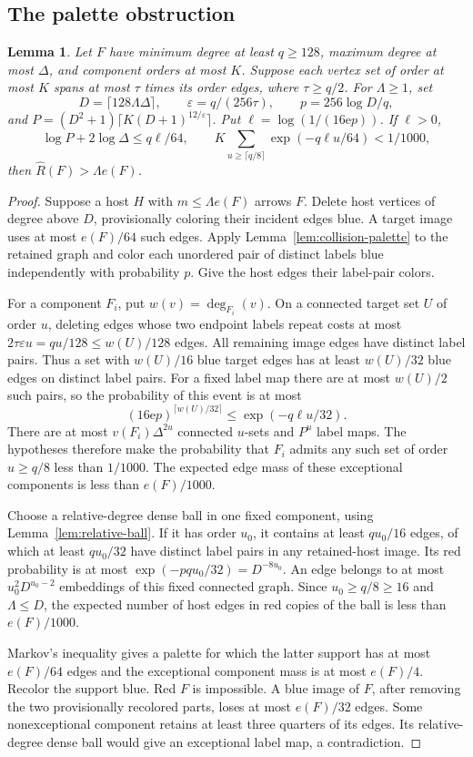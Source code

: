 \documentclass[11pt]{amsart}
\newtheorem{lemma}[theorem]{Lemma}
\theoremstyle{definition}
\theoremstyle{remark}
\numberwithin{equation}{section}
\newcommand{\e}{\mathrm e}
\begin{document}
\subsection{The palette obstruction}
\begin{lemma}\label{lem:palette-obstruction}
Let $F $ have minimum degree at least $ q\ge128$, maximum degree at most
$\Delta $, and component orders at most $ K$. Suppose each vertex set of
order at most $K $ spans at most $\tau$ times its order edges, where
$\tau\ge q/2$. For $\Lambda\ge1$, set
\[
 D=\lceil128\Lambda\Delta\rceil,\qquad
 \varepsilon=q/(256\tau),\qquad p=256\log D/q,
\]
and $P=(D^2+1)\lceil K(D+1)^{12/\varepsilon}\rceil$.
Put $\ell=\log(1/(16\e p))$. If $\ell>0$,
\[
 \log P+2\log\Delta\le q\ell/64,
 \qquad K\sum_{u\ge\lceil q/8\rceil}\exp(-q\ell u/64)<1/1000,
\]
then $\widehat R(F)>\Lambda e(F)$.
\end{lemma}
\begin{proof}
Suppose a host $H $ with $ m\le\Lambda e(F)$ arrows $ F$.
Delete host vertices of degree above $D$, provisionally coloring their
incident edges blue. A target image uses at most $e(F)/64$ such edges.
Apply Lemma~\ref{lem:collision-palette} to the retained graph and color
each unordered pair of distinct labels blue independently with probability
$p$. Give the host edges their label-pair colors.

For a component $F_i $, put $ w(v)=\deg_{F_i}(v)$. On a connected target
set $U $ of order $ u$, deleting edges whose two endpoint labels repeat
costs at most $2\tau\varepsilon u=qu/128\le w(U)/128$ edges.
All remaining image edges have distinct label pairs. Thus a set with
$w(U)/16$ blue target edges has at least $ w(U)/32$ blue edges on
distinct label pairs. For a fixed label map there are at most $w(U)/2$
such pairs, so the probability of this event is at most
\[
 (16\e p)^{\lceil w(U)/32\rceil}\le\exp(-q\ell u/32).
\]
There are at most $v(F_i)\Delta^{2u}$ connected $ u $-sets and $ P^u$
label maps. The hypotheses therefore make the probability that $F_i$
admits any such set of order $u\ge q/8$ less than $1/1000$.
The expected edge mass of these exceptional components is less than
$e(F)/1000$.

Choose a relative-degree dense ball in one fixed component, using
Lemma~\ref{lem:relative-ball}. If it has order $u_0$, it contains
at least $qu_0/16$ edges, of which at least $ qu_0/32$ have distinct
label pairs in any retained-host image. Its red probability is at most
$\exp(-pqu_0/32)=D^{-8u_0}$. An edge belongs to at most
$u_0^2D^{u_0-2}$ embeddings of this fixed connected graph.
Since $u_0\ge q/8\ge16$ and $\Lambda\le D$, the expected number of
host edges in red copies of the ball is less than $e(F)/1000$.

Markov's inequality gives a palette for which the latter support has
at most $e(F)/64$ edges and the exceptional component mass is at most
$e(F)/4$. Recolor the support blue. Red $ F$ is impossible. A blue
image of $F$, after removing the two provisionally recolored parts,
loses at most $e(F)/32$ edges. Some nonexceptional component retains
at least three quarters of its edges. Its relative-degree dense ball
would give an exceptional label map, a contradiction.
\end{proof}
\end{document}
